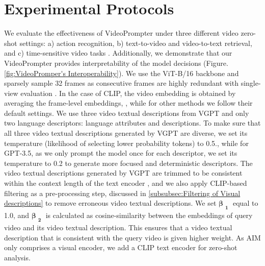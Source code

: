 \documentclass{article} \usepackage{iclr2024_conference,times}
\begin{document}
\section{Experimental Protocols}
\label{headings}
We evaluate the effectiveness of VideoPrompter under three different video zero-shot settings: a) action recognition, b) text-to-video and video-to-text retrieval, and c) time-sensitive video tasks \citep{bagad2023test}. Additionally, we demonstrate that our VideoPrompter provides interpretability of the model decisions (Figure. \ref{fig:VideoPromper's Interoperability}). We use the ViT-B/16 backbone and sparsely sample 32 frames as consecutive frames are highly redundant with single-view evaluation \citep{Rasheed_2023_CVPR}. In the case of CLIP, the video embedding is obtained by averaging the frame-level embeddings, \citep{portillo2021straightforward,Rasheed_2023_CVPR}, while for other methods we follow their default settings. 
We use three video textual descriptions from VGPT and only two language descriptors: language attributes and descriptions. To make sure that all three video textual descriptions generated by VGPT are diverse, we set its temperature (likelihood of selecting lower probability tokens) to 0.5., while for GPT-3.5, as we only prompt the model once for each descriptor, we set its temperature to 0.2 to generate more focused and deterministic descriptors. The video textual descriptions generated by VGPT are trimmed to be consistent within the context length of the text encoder \citep{radford2021learning}, and we also apply CLIP-based filtering as a pre-processing step,  discussed in  \ref{subsubsec:Filtering of Visual descriptions} to remove erroneous video textual descriptions. We set $\bm{\beta_{\substack{1}}}$  equal to 1.0, and $\bm{\beta_{\substack{2}}}$ is calculated as cosine-similarity between the embeddings of query video and its video textual description. This ensures that a video textual description that is consistent with the query video is given higher weight. As AIM \citep{yang2023aim} only comprises a visual encoder, we add a CLIP text encoder for zero-shot analysis. 
\end{document}
